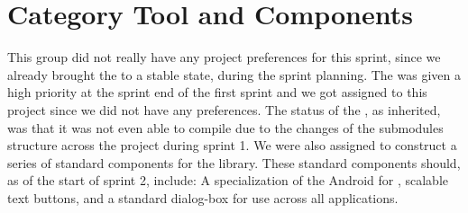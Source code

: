 \section{Category Tool and Components}

This group did not really have any project preferences for this sprint, since we already brought the \launcher to a stable state, during the sprint planning. The \giraf \ct was given a high priority at the sprint end of the first sprint and we got assigned to this project since we did not have any preferences. The status of the \ct, as inherited, was that it was not even able to compile due to the changes of the submodules structure across the project during sprint 1. We were also assigned to construct a series of standard components for the  library. These standard components should, as of the start of sprint 2, include: A specialization of the Android  for \giraf, scalable text buttons, and a standard dialog-box for use across all applications. 
